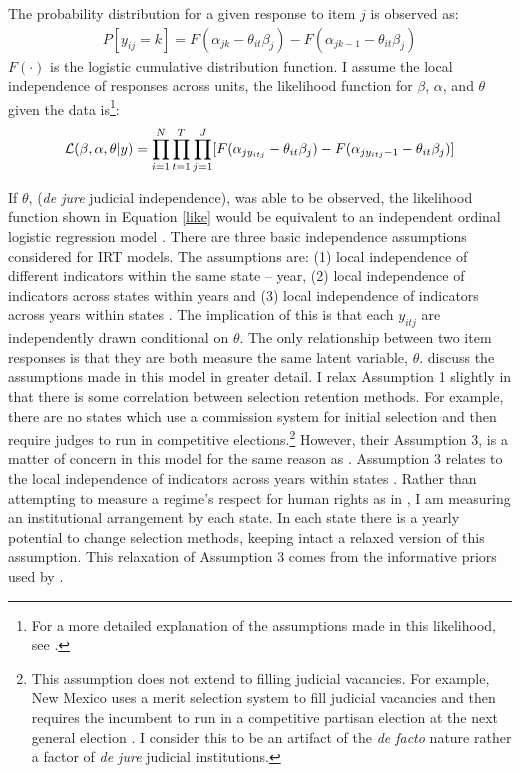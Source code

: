 \documentclass[JohnsonMADraft2]{subfiles}
\begin{document}
The probability distribution for a given response to item $j$ is observed as:
\begin{align}
P[y_{ij}=k]=F(\alpha_{jk}-\theta_{it}\beta_j)-F(\alpha_{jk-1}-\theta_{it}\beta_j)
\end{align} $F(\cdot)$ is the logistic cumulative distribution function.  I assume the local independence of responses across units, the likelihood function for $\beta$, $\alpha$, and $\theta$ given the data is\footnote{For a more detailed explanation of the assumptions made in this likelihood, see \citep[8]{Schnakenberg2014}.}:
\begin{align}\label{like}
	{\cal L} (\beta,\alpha,\theta|y)=\prod_{i=1}^{N}\prod_{t=1}^{T}\prod_{j=1}^{J}[F(\alpha_{jy_{itj}}-\theta_{it}\beta_j)-F(\alpha_{jy_{itj}-1}-\theta_{it}\beta_j)]
\end{align} 

If $\theta$, (\textit{de jure} judicial independence), was able to be observed, the likelihood function shown in Equation \ref{like} would be equivalent to an independent ordinal logistic regression model \citep[8]{Schnakenberg2014}.  There are three basic independence assumptions considered for IRT models.  The assumptions are: (1) local independence of different indicators within the same state -- year, (2) local independence of indicators across states within years and (3) local independence of indicators across years within states \citep[8]{Schnakenberg2014}.  The implication of this is that each $y_{itj}$ are independently drawn conditional on $\theta$.  The only relationship between two item responses is that they are both measure the same latent variable, $\theta$. \citet[8]{Schnakenberg2014} discuss the assumptions made in this model in greater detail.  I relax Assumption 1 slightly in that there is some correlation between selection retention methods. For example, there are no states which use a commission system for initial selection and then require judges to run in competitive elections.\footnote{This assumption does not extend to filling judicial vacancies.  For example, New Mexico uses a merit selection system to fill judicial vacancies and then requires the incumbent to run in a competitive partisan election at the next general election \citep{AJS}.  I consider this to be an artifact of the \textit{de facto} nature rather a factor of \textit{de jure} judicial institutions.}  However, their Assumption 3, is a matter of concern in this model for the same reason as \citep{Schnakenberg2014}.  Assumption 3 relates to the local independence of indicators across years within states \citep[8]{Schnakenberg2014}.  Rather than attempting to measure a regime's respect for human rights as in \citet{Schnakenberg2014}, I am measuring an institutional arrangement by each state.  In each state there is a yearly potential to change selection methods, keeping intact a relaxed version of this assumption.  This relaxation of Assumption 3 comes from the informative priors used by \citet[8]{Schnakenberg2014}.    

%
%
\end{document}
